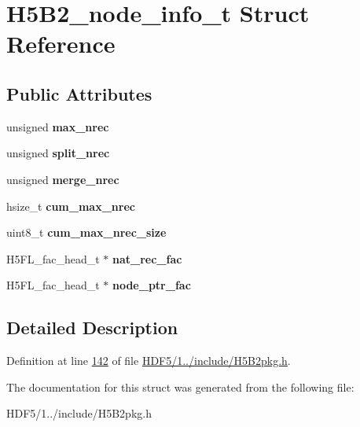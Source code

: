 \hypertarget{struct_h5_b2__node__info__t}{}\section{H5\+B2\+\_\+node\+\_\+info\+\_\+t Struct Reference}
\label{struct_h5_b2__node__info__t}
\subsection*{Public Attributes}
\begin{DoxyCompactItemize}
\item 
\mbox{\label{struct_h5_b2__node__info__t_aa6597baca388ed966fc39395f4df29d0}} 
unsigned {\bfseries max\+\_\+nrec}
\item 
\mbox{\label{struct_h5_b2__node__info__t_a22676dc2c3e502c09b80b174502a599b}} 
unsigned {\bfseries split\+\_\+nrec}
\item 
\mbox{\label{struct_h5_b2__node__info__t_ae62f44b348ddc398aff56c0cf900a487}} 
unsigned {\bfseries merge\+\_\+nrec}
\item 
\mbox{\label{struct_h5_b2__node__info__t_a30cdcff3b83d3a958eae4a1cc482a7ed}} 
hsize\+\_\+t {\bfseries cum\+\_\+max\+\_\+nrec}
\item 
\mbox{\label{struct_h5_b2__node__info__t_a7709eb3ccf2ae270196129d8d8154b5b}} 
uint8\+\_\+t {\bfseries cum\+\_\+max\+\_\+nrec\+\_\+size}
\item 
\mbox{\label{struct_h5_b2__node__info__t_aa23ff9f2c99c24e417ee8fe3247179b6}} 
H5\+F\+L\+\_\+fac\+\_\+head\+\_\+t $\ast$ {\bfseries nat\+\_\+rec\+\_\+fac}
\item 
\mbox{\label{struct_h5_b2__node__info__t_a9052e3defcc8b64f13a6c3fddb49f83f}} 
H5\+F\+L\+\_\+fac\+\_\+head\+\_\+t $\ast$ {\bfseries node\+\_\+ptr\+\_\+fac}
\end{DoxyCompactItemize}


\subsection{Detailed Description}


Definition at line \hyperlink{_h_d_f5_21_810_81_2include_2_h5_b2pkg_8h_source_l00142}{142} of file \hyperlink{_h_d_f5_21_810_81_2include_2_h5_b2pkg_8h_source}{H\+D\+F5/1../include/\+H5\+B2pkg.\+h}.



The documentation for this struct was generated from the following file\+:\begin{DoxyCompactItemize}
\item 
H\+D\+F5/1../include/\+H5\+B2pkg.\+h\end{DoxyCompactItemize}
